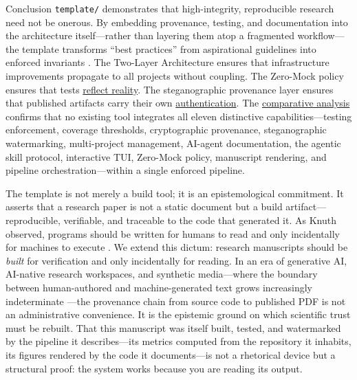 \documentclass[
  ignorenonframetext,
]{beamer}
\begin{document}
\begin{frame}{Conclusion}
\protect{}\label{conclusion}
\texttt{template/} demonstrates that high-integrity, reproducible
research need not be onerous. By embedding provenance, testing, and
documentation into the architecture itself---rather than layering them
atop a fragmented workflow---the template transforms ``best practices''
from aspirational guidelines into enforced invariants
. The
Two-Layer Architecture ensures that infrastructure improvements
propagate to all projects without coupling. The Zero-Mock policy ensures
that tests
\href{05a_zeromock_tradeoff.md\#the-zero-mock-tradeoff}{reflect
reality}. The steganographic provenance layer ensures that published
artifacts carry their own
\href{07_security_provenance.md\#security-and-provenance}{authentication}.
The \href{08f_appendix_matrix.md\#appendix-matrix}{comparative analysis}
confirms that no existing tool integrates all eleven distinctive
capabilities---testing enforcement, coverage thresholds, cryptographic
provenance, steganographic watermarking, multi-project management,
AI-agent documentation, the agentic skill protocol, interactive TUI,
Zero-Mock policy, manuscript rendering, and pipeline
orchestration---within a single enforced pipeline.

The template is not merely a build tool; it is an epistemological
commitment. It asserts that a research paper is not a static document
but a build artifact---reproducible, verifiable, and traceable to the
code that generated it. As Knuth observed, programs should be written
for humans to read and only incidentally for machines to execute
. We extend this dictum: research manuscripts
should be \emph{built} for verification and only incidentally for
reading. In an era of generative AI, AI-native research workspaces, and
synthetic media---where the boundary between human-authored and
machine-generated text grows increasingly indeterminate
---the provenance chain from source code to
published PDF is not an administrative convenience. It is the epistemic
ground on which scientific trust must be rebuilt. That this manuscript
was itself built, tested, and watermarked by the pipeline it
describes---its metrics computed from the repository it inhabits, its
figures rendered by the code it documents---is not a rhetorical device
but a structural proof: the system works because you are reading its
output.
\end{frame}
\end{document}
